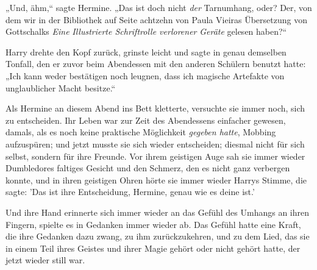 „Und, ähm,“ sagte Hermine. „Das ist doch nicht \emph{der} Tarnumhang, oder? Der, von dem wir in der Bibliothek auf Seite achtzehn von Paula Vieiras Übersetzung von Gottschalks \emph{Eine} \emph{Illustrierte Schriftrolle verlorener} \emph{Geräte} gelesen haben?“

Harry drehte den Kopf zurück, grinste leicht und sagte in genau demselben Tonfall, den er zuvor beim Abendessen mit den anderen Schülern benutzt hatte: „Ich kann weder bestätigen noch leugnen, dass ich magische Artefakte von unglaublicher Macht besitze.“

\later

Als Hermine an diesem Abend ins Bett kletterte, versuchte sie immer noch, sich zu entscheiden. Ihr Leben war zur Zeit des Abendessens einfacher gewesen, damals, als es noch keine praktische Möglichkeit \emph{gegeben hatte}, Mobbing aufzuspüren; und jetzt musste sie sich wieder entscheiden; diesmal nicht für sich selbst, sondern für ihre Freunde. Vor ihrem geistigen Auge sah sie immer wieder Dumbledores faltiges Gesicht und den Schmerz, den es nicht ganz verbergen konnte, und in ihren geistigen Ohren hörte sie immer wieder Harrys Stimme, die sagte: 'Das ist ihre Entscheidung, Hermine, genau wie es deine ist.'

Und ihre Hand erinnerte sich immer wieder an das Gefühl des Umhangs an ihren Fingern, spielte es in Gedanken immer wieder ab. Das Gefühl hatte eine Kraft, die ihre Gedanken dazu zwang, zu ihm zurückzukehren, und zu dem Lied, das sie in einem Teil ihres Geistes und ihrer Magie gehört oder nicht gehört hatte, der jetzt wieder still war.

